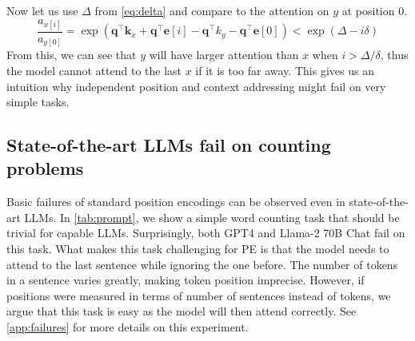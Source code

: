 \documentclass{article}
\renewcommand{\vec}{\mathbf}
\begin{document}
Now let us use $\Delta$ from \cref{eq:delta} and compare to the attention on $y$ at position 0.
\[
\frac{a_{x[i]}}{a_{y[0]}} = \exp{(\vec{q}^\top \vec{k}_x + \vec{q}^\top \vec{e}[i] - \vec{q}^\top k_y - \vec{q}^\top \vec{e}[0])} <  \exp{(\Delta - i \delta)}
\]
From this, we can see that $y$  will have larger attention  than $x$ when $i > \Delta / \delta$, thus the model cannot attend to the last $x$ if it is too far away.
%
This  gives us an intuition  why independent position and context addressing might fail on very simple tasks.

\subsection{State-of-the-art LLMs fail on counting problems}
\label{sec:counting_failure}
Basic failures of standard position encodings can be observed even in state-of-the-art LLMs.
In \cref{tab:prompt}, we show a simple word counting task that should be trivial for capable LLMs. Surprisingly, both GPT4 and Llama-2 70B Chat  fail on this task.
What makes this task challenging for PE is that the model needs to attend to the last sentence while ignoring the one before.
The number of tokens in a sentence varies greatly, making token position imprecise.
However, if positions were measured in terms of number of sentences instead of tokens, we argue that this task is easy as the model will then attend correctly.
See \cref{app:failures} for more details on this experiment.
\end{document}
